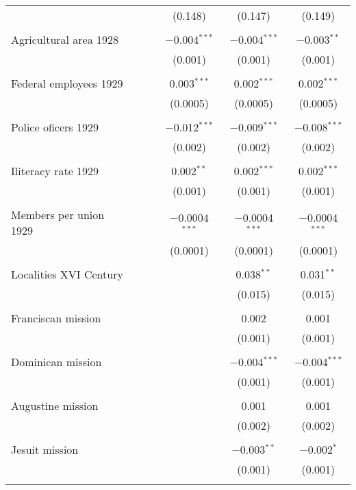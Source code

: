 \begin{table}[!htbp]
\begin{tabular}{@{\extracolsep{5pt}}lccccc}
  &  &  & (0.148) & (0.147) & (0.149) \\ 
  & & & & & \\ 
 Agricultural area 1928 &  &  & $-$0.004$^{***}$ & $-$0.004$^{***}$ & $-$0.003$^{**}$ \\ 
  &  &  & (0.001) & (0.001) & (0.001) \\ 
  & & & & & \\ 
 Federal employees 1929 &  &  & 0.003$^{***}$ & 0.002$^{***}$ & 0.002$^{***}$ \\ 
  &  &  & (0.0005) & (0.0005) & (0.0005) \\ 
  & & & & & \\ 
 Police oficers 1929 &  &  & $-$0.012$^{***}$ & $-$0.009$^{***}$ & $-$0.008$^{***}$ \\ 
  &  &  & (0.002) & (0.002) & (0.002) \\ 
  & & & & & \\ 
 Iliteracy rate 1929 &  &  & 0.002$^{**}$ & 0.002$^{***}$ & 0.002$^{***}$ \\ 
  &  &  & (0.001) & (0.001) & (0.001) \\ 
  & & & & & \\ 
 Members per union 1929 &  &  & $-$0.0004$^{***}$ & $-$0.0004$^{***}$ & $-$0.0004$^{***}$ \\ 
  &  &  & (0.0001) & (0.0001) & (0.0001) \\ 
  & & & & & \\ 
 Localities XVI Century &  &  &  & 0.038$^{**}$ & 0.031$^{**}$ \\ 
  &  &  &  & (0.015) & (0.015) \\ 
  & & & & & \\ 
 Franciscan mission &  &  &  & 0.002 & 0.001 \\ 
  &  &  &  & (0.001) & (0.001) \\ 
  & & & & & \\ 
 Dominican mission &  &  &  & $-$0.004$^{***}$ & $-$0.004$^{***}$ \\ 
  &  &  &  & (0.001) & (0.001) \\ 
  & & & & & \\ 
 Augustine mission &  &  &  & 0.001 & 0.001 \\ 
  &  &  &  & (0.002) & (0.002) \\ 
  & & & & & \\ 
 Jesuit mission &  &  &  & $-$0.003$^{**}$ & $-$0.002$^{*}$ \\ 
  &  &  &  & (0.001) & (0.001) \\ 
  & & & & & \\ 

\end{tabular}
\end{table}
